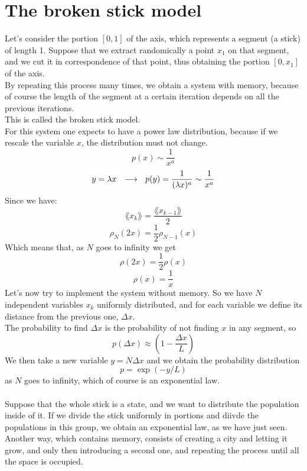 \section{The broken stick model}
Let's consider the portion $[0,1]$ of the axis, which represents a segment (a stick) of length 1. Suppose that we extract randomically a point $x_1$ on that segment, and we cut it in correspondence of that point, thus obtaining the portion $[0,x_1]$ of the axis. \\
By repeating this process many times, we obtain a system with memory, because of course the length of the segment at a certain iteration depends on all the previous iterations. \\
This is called the broken stick model. \\
For this system one expects to have a power law distribution, because if we rescale the variable $x$, the distribution must not change.
$$
	p(x) \sim \frac{1}{x^a}
$$
$$
	y = \lambda x \ \ \longrightarrow \ \ p(y) = \frac{1}{(\lambda x)^a} \sim \frac{1}{x^a}
$$
Since we have:
$$
	\lang x_k \rang = \frac{\lang x_{k-1} \rang}{2}
$$
$$
	\rho_N(2x) = \frac{1}{2}\rho_{N-1}(x)
$$
Which means that, as $N$ goes to infinity we get
$$
	\rho(2x) = \frac{1}{2}\rho(x)
$$
$$
	\rho(x) = \frac{1}{x}
$$
Let's now try to implement the system without memory. So we have $N$ independent variables $x_k$ uniformly distributed, and for each variable we define its distance from the previous one, $\Delta x$. \\
The probability to find $\Delta x$ is the probability of not finding $x$ in any segment, so
$$
	p(\Delta x) \approx \left( 1 - \frac{\Delta x}{L} \right)
$$
We then take a new variable $y = N\Delta x$ and we obtain the probability distribution
$$
	p = \exp(-y/L)
$$
as $N$ goes to infinity, which of course is an exponential law. \\ \\
Suppose that the whole stick is a state, and we want to distribute the population inside of it. If we divide the stick uniformly in portions and diivde the populations in this group, we obtain an exponential law, as we have just seen. \\
Another way, which contains memory, consists of creating a city and letting it grow, and only then introducing a second one, and repeating the process until all the space is occupied. 
